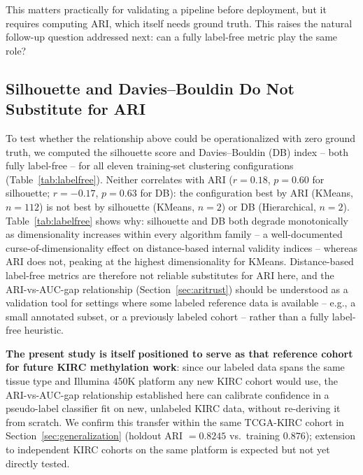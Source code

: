 \documentclass[sigconf]{acmart}
\begin{document}
This matters practically for validating a pipeline before deployment, but it requires computing ARI, which itself needs ground truth. This raises the natural follow-up question addressed next: can a fully label-free metric play the same role?

\subsection{Silhouette and Davies--Bouldin Do Not Substitute for ARI}
\label{sec:labelfree}
To test whether the relationship above could be operationalized with zero ground truth, we computed the silhouette score and Davies--Bouldin (DB) index -- both fully label-free -- for all eleven training-set clustering configurations (Table~\ref{tab:labelfree}). Neither correlates with ARI ($r=0.18$, $p=0.60$ for silhouette; $r=-0.17$, $p=0.63$ for DB): the configuration best by ARI (KMeans, $n=112$) is not best by silhouette (KMeans, $n=2$) or DB (Hierarchical, $n=2$). Table~\ref{tab:labelfree} shows why: silhouette and DB both degrade monotonically as dimensionality increases within every algorithm family -- a well-documented curse-of-dimensionality effect on distance-based internal validity indices -- whereas ARI does not, peaking at the highest dimensionality for KMeans. Distance-based label-free metrics are therefore not reliable substitutes for ARI here, and the ARI-vs-AUC-gap relationship (Section~\ref{sec:aritrust}) should be understood as a validation tool for settings where some labeled reference data is available -- e.g., a small annotated subset, or a previously labeled cohort -- rather than a fully label-free heuristic.

\textbf{The present study is itself positioned to serve as that reference cohort for future KIRC methylation work}: since our labeled data spans the same tissue type and Illumina 450K platform any new KIRC cohort would use, the ARI-vs-AUC-gap relationship established here can calibrate confidence in a pseudo-label classifier fit on new, unlabeled KIRC data, without re-deriving it from scratch. We confirm this transfer within the same TCGA-KIRC cohort in Section~\ref{sec:generalization} (holdout ARI $=0.8245$ vs.\ training $0.876$); extension to independent KIRC cohorts on the same platform is expected but not yet directly tested.
\end{document}
